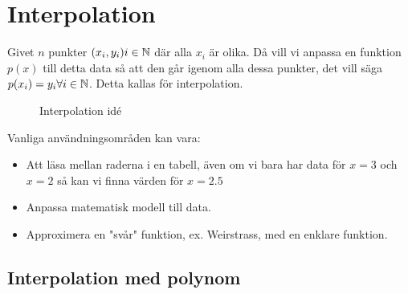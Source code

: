 \section{Interpolation}

\noindent Givet $n$ punkter $(x_i, y_i) i\in\mathbb{N}$ där alla $x_i$ är olika. Då vill vi anpassa en funktion $p(x)$ till detta data så att den går igenom alla dessa punkter, det vill säga $p(x_i)=y_i \forall i\in\mathbb{N}$. Detta kallas för interpolation.
\par\bigskip

\begin{figure}[ht]
    \centering
    \caption{Interpolation idé}
    \label{fig:interpolation-idé}
\end{figure}

\noindent Vanliga användningsområden kan vara:
\begin{itemize}
  \item Att läsa mellan raderna i en tabell, även om vi bara har data för $x=3$ och $x=2$ så kan vi finna värden för $x=2.5$
  \item Anpassa matematisk modell till data.
  \item Approximera en "svår" funktion, ex. Weirstrass, med en enklare funktion.
\end{itemize}
\par\bigskip
\subsection{Interpolation med polynom}\hfill\\

